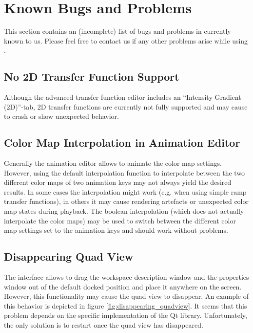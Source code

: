 \section{Known Bugs and Problems}

This section contains an (incomplete) list of bugs and problems in \Voreen currently known to us.
Please feel free to contact us if any other problems arise while using \Voreen.

\subsection{No 2D Transfer Function Support}

Although the advanced transfer function editor includes an ``Intensity Gradient (2D)''-tab, 2D transfer functions
are currently not fully supported and may cause \Voreen to crash or show unexpected behavior.

\subsection{Color Map Interpolation in Animation Editor}

Generally the animation editor allows to animate the color map settings. However, using the default interpolation function to interpolate between the two different
color maps of two animation keys may not always yield the desired results. In some cases the interpolation might work (e.g. when 
using simple ramp transfer functions), in others it may cause rendering artefacts or unexpected color map states during playback. The boolean interpolation 
(which does not actually interpolate the color maps) may
be used to switch between the different color map settings set to the animation keys and should work without problems.

\subsection{Disappearing Quad View}

The \Voreen interface allows to drag the workspace description window and the properties window out of the default docked position and 
place it anywhere on the screen. 
However, this functionality may cause the quad view to disappear. An example of this behavior is depicted in figure \ref{fig:disappearing_quadview}. It seems
that this problem depends on the specific implementation of the Qt library. Unfortunately, the only solution is to restart \Voreen once the quad view has disappeared.

